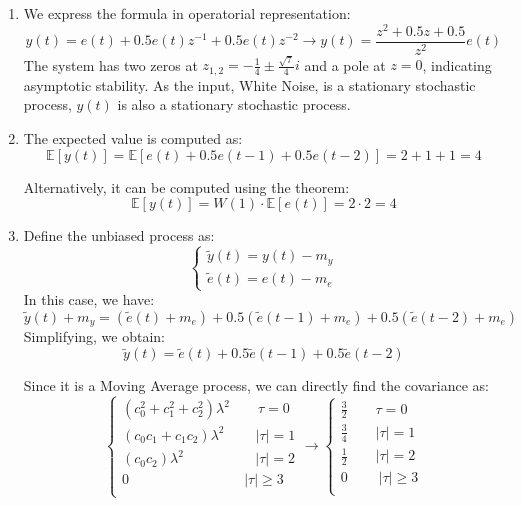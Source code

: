 \begin{enumerate}
    \item We express the formula in operatorial representation:
        \[y(t)=e(t)+0.5e(t)z^{-1}+0.5e(t)z^{-2}\rightarrow y(t)=\dfrac{z^2+0.5z+0.5}{z^2}e(t)\]
        The system has two zeros at $z_{1,2}=-\frac{1}{4}\pm \frac{\sqrt{7}}{4}i$  and a pole at $z=0$, indicating asymptotic stability.
        As the input,  White Noise, is a stationary stochastic process, $y(t)$ is also a stationary stochastic process.
    \item The expected value is computed as:
        \[\mathbb{E}\left[ y(t) \right]=\mathbb{E}\left[ e(t)+0.5e(t-1)+0.5e(t-2) \right]=2+1+1=4\]

        Alternatively, it can be computed using the theorem: 
        \[\mathbb{E}\left[ y(t) \right]=W(1)\cdot\mathbb{E}\left[ e(t) \right]=2\cdot 2=4\]
    \item Define the unbiased process as: 
        \[\begin{cases}
            \tilde{y}(t)=y(t)-m_y \\
            \tilde{e}(t)=e(t)-m_e
        \end{cases}\]
        In this case, we have: 
        \[\tilde{y}(t)+m_y=\left(\tilde{e}(t)+m_e\right)+0.5\left(\tilde{e}(t-1)+m_e\right)+0.5\left(\tilde{e}(t-2)+m_e\right)\]
        Simplifying, we obtain: 
        \[\tilde{y}(t)=\tilde{e}(t)+0.5\tilde{e}(t-1)+0.5\tilde{e}(t-2)\]

        Since it is a Moving Average process, we can directly find the covariance as: 
        \[\begin{cases}
            \left(c_0^2+c_1^2+c_2^2\right)\lambda^2 \qquad \tau=0 \\
            \left(c_0c_1+c_1c_2\right)\lambda^2 \qquad\: \left\lvert \tau\right\rvert =1 \\
            \left(c_0c_2\right)\lambda^2 \qquad\qquad\:\:\:\:\: \left\lvert \tau\right\rvert =2 \\
            0 \qquad\qquad\qquad\qquad\: \left\lvert \tau\right\rvert \geq 3 \\
        \end{cases} \rightarrow \begin{cases}
            \frac{3}{2} \qquad \tau=0 \\
            \frac{3}{4} \qquad \left\lvert \tau\right\rvert =1 \\
            \frac{1}{2} \qquad \left\lvert \tau\right\rvert =2 \\
            0 \:\qquad \left\lvert \tau\right\rvert \geq 3 \\
        \end{cases}\]
\end{enumerate}